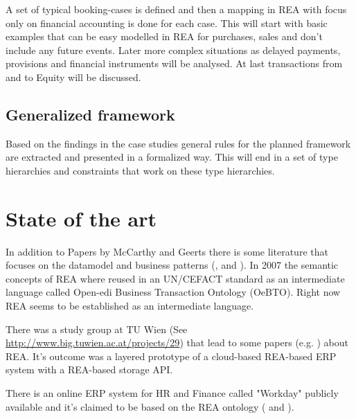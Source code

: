 A set of typical booking-cases is defined and then a mapping in REA with focus only on financial accounting is done for each case.
This will start with basic examples that can be easy modelled in REA for purchases, sales and don't include any future events.
Later more complex situations as delayed payments, provisions and financial instruments will be analysed.
At last transactions from and to Equity will be discussed.

\subsection*{ Generalized framework}

Based on the findings in the case studies general rules for the planned framework are extracted and presented in a formalized way.
This will end in a set of type hierarchies and constraints that work on these type hierarchies.


\section*{State of the art}

In addition to Papers by McCarthy and Geerts there is some literature that focuses on the datamodel and business patterns (\cite{dunn2005enterpriseinfosys}, \cite{hruby2006modeldrivendesign} and \cite{hollander2000accounting}).
In 2007 the semantic concepts of REA where reused in an UN/CEFACT standard \cite{ISOIEC1594442007} as an intermediate language called Open-edi Business Transaction Ontology (OeBTO).
Right now REA seems to be established as an intermediate language.  

There was a study group at TU Wien (See \url{http://www.big.tuwien.ac.at/projects/29}) that lead to some papers (e.g. \cite{wally2015modeldriven}) about REA.
It's outcome was a layered prototype of a cloud-based REA-based ERP system with a REA-based storage API.

There is an online ERP system for HR and Finance called "Workday" publicly available and it's claimed to be based on the REA ontology (\cite{nittler2012modernizeaccounting} and \cite{howlett2007workdayfinancials}).



